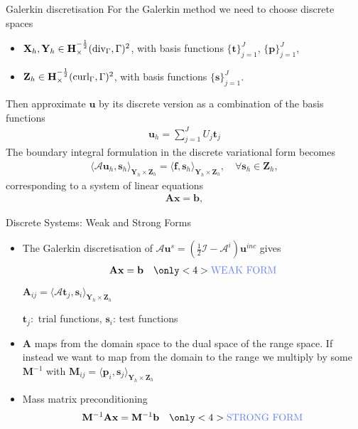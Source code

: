 \documentclass[12pt]{beamer}
\newcommand{\myfootnote}[1]{
    \renewcommand{\thefootnote}{}
    \footnotetext{\scriptsize#1}
    \renewcommand{\thefootnote}{\arabic{footnote}}
}
\begin{document}
\begin{frame}{Galerkin discretisation}
    For the Galerkin method we need to choose discrete spaces
    \begin{itemize}
        \item $\mathbf{X}_h, \mathbf{Y}_h \in \mathbf{H}^{-\frac{1}{2}}_\times (\textnormal{div}_\Gamma, \Gamma)^2$, with basis functions $\{\mathbf{t}\}_{j=1}^J$, $\{\mathbf{p}\}_{j=1}^J$,
        \item $\mathbf{Z}_h \in  \mathbf{H}^{-\frac{1}{2}}_\times (\textnormal{curl}_\Gamma, \Gamma)^2$, with basis functions $\{ \mathbf{s}\}_{j=1}^J$.
    \end{itemize}
    Then approximate $\mathbf{u}$ by its discrete version as a combination of the basis functions
    \begin{align}
    \mathbf{u}_h = \sum_{j=1}^J U_j \mathbf{t}_j \nonumber 
\end{align}
The boundary integral formulation in the discrete variational form becomes
\begin{align}
    \langle \bm{\mathcal{A}} \mathbf{u}_h, \mathbf{s}_h\rangle_{\mathbf{Y}_h \times \mathbf{Z}_h} = \langle  \mathbf{f}, \mathbf{s}_h \rangle_{\mathbf{Y}_h \times \mathbf{Z}_h} , \quad \forall \mathbf{s}_h \in \mathbf{Z}_h, \nonumber
\end{align}
corresponding to a system of linear equations
\begin{eqnarray}
\mathbf{Ax} = \mathbf{b}, \nonumber 
\end{eqnarray}
\end{frame}

\begin{frame}{Discrete Systems: Weak and Strong Forms}
\myfootnote{\fullcite{betcke2017product}}
    \begin{itemize}
    \item The Galerkin discretisation of $\bm{\mathcal{A}}\mathbf{ u}^s = \left(\frac{1}{2}\bm{\mathcal{ {I}}} - \bm{\mathcal{{A}}}^i \right) \mathbf{u}^{inc} $ gives
    \begin{align}
        \mathbf{A} \mathbf{x} = \mathbf{b} \quad \only<4>{\textnormal{\color{bluecolour}   WEAK FORM}}\nonumber
    \end{align}
    $\mathbf{A}_{ij} = \langle \bm{\mathcal{A}} \mathbf{t}_j,\mathbf{s}_i\rangle _{\mathbf{Y}_h \times \mathbf{Z}_h}$
    
    $\mathbf{t}_j:$ trial functions, 
    $\mathbf{s}_i$: test functions 
    \pause
    \item $\mathbf{A}$ maps from the domain space to the dual space of the range space. If instead we want to map from the domain to the range we multiply by some $\mathbf{M}^{-1}$ with $\mathbf{M}_{ij} = \langle \mathbf{p}_i, \mathbf{s}_j \rangle _{\mathbf{Y}_h \times \mathbf{Z}_h}$
    \pause
    \item Mass matrix preconditioning
    \begin{align}
        \mathbf{M}^{-1} \mathbf{A} \mathbf{x} = \mathbf{M}^{-1} \mathbf{b} \quad  \only<4>{\textnormal{\color{bluecolour}   STRONG FORM}} \nonumber
    \end{align}
    \end{itemize}
\end{frame}
\end{document}
